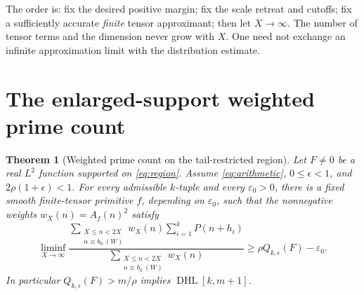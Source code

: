 \documentclass[11pt,a4paper]{article}
\newtheorem{theorem}{Theorem}[section]
\theoremstyle{definition}\newtheorem{definition}[theorem]{Definition}
\theoremstyle{remark}\newtheorem{remark}[theorem]{Remark}
\newcommand{\DHL}{\operatorname{DHL}}
\numberwithin{equation}{section}
\begin{document}
The order is: fix the desired positive margin; fix the scale retreat and cutoffs; fix a sufficiently accurate \emph{finite} tensor approximant; then let $X\to\infty$. The number of tensor terms and the dimension never grow with $X$. One need not exchange an infinite approximation limit with the distribution estimate.

\section{The enlarged-support weighted prime count}\label{sec:enlarged}
\begin{theorem}[Weighted prime count on the tail-restricted region]\label{prop:firstmoment}
Let $F\ne0$ be a real $L^2$ function supported on \eqref{eq:region}. Assume \eqref{eq:arithmetic}, $0\le\epsilon<1$, and $2\rho(1+\epsilon)<1$. For every admissible $k$-tuple and every $\varepsilon_0>0$, there is a fixed smooth finite-tensor primitive $f$, depending on $\varepsilon_0$, such that the nonnegative weights $w_X(n)=A_f(n)^2$ satisfy
\begin{equation}\label{eq:first-prime-weight}
 \liminf_{X\to\infty}
 \frac{\displaystyle\sum_{\substack{X\le n<2X\\n\equiv b_0\ (W)}}
 w_X(n)\sum_{i=1}^k P(n+h_i)}
 {\displaystyle\sum_{\substack{X\le n<2X\\n\equiv b_0\ (W)}}w_X(n)}
 \ge\rho Q_{k,\epsilon}(F)-\varepsilon_0.
\end{equation}
In particular $Q_{k,\epsilon}(F)>m/\rho$ implies $\DHL[k,m+1]$.
\end{theorem}
\end{document}
